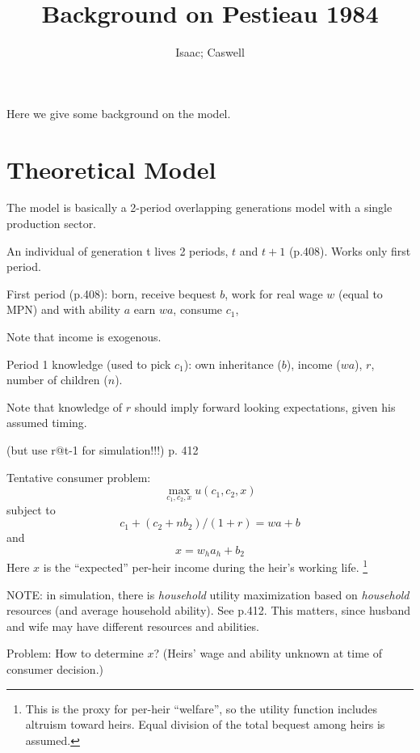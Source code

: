 \documentclass{article}
\begin{document}
\author{Isaac; Caswell}
\title{Background on Pestieau 1984}
\maketitle

Here we give some background on the \citet{pestieau-1984-oep} model.


\section{Theoretical Model}

The model is basically a 2-period overlapping generations model with a single production sector.

An individual of generation t lives 2 periods, $t$ and $t+1$ (p.408).
Works only first period.

First period (p.408):
born,
receive bequest $b$,
work for real wage $w$ (equal to MPN) and with ability $a$ earn $wa$,
consume $c_{1}$,

Note that income is exogenous.

Period 1 knowledge (used to pick $c_{1}$):
own inheritance ($b$),
income ($wa$), $r$, number of children ($n$).

Note that knowledge of $r$ should imply forward looking expectations,
given his assumed timing.

(but use r@t-1 for simulation!!!) p. 412

Tentative consumer problem:
\begin{equation}
\max_{c_{1},c_{2},x} u(c_{1}, c_{2}, x)
\end{equation}
subject to
\begin{equation}
c_{1} + (c_{2} + n b_{2})/(1+r) = w a + b
\end{equation}
and
\begin{equation}
x = w_{h}a_{h}+ b_{2}
\end{equation}
Here $x$ is the ``expected'' per-heir income during the heir's working life.%
\footnote{%
This is the proxy for per-heir ``welfare'',
so the utility function includes altruism toward heirs.
Equal division of the total bequest among heirs is assumed.
} %
%

NOTE: in simulation, there is \emph{household} utility maximization
based on \emph{household} resources (and average household ability).
See p.412.
This matters, since husband and wife may have different resources and abilities.


Problem: How to determine $x$?
(Heirs' wage and ability unknown at time of consumer decision.)
\end{document}
